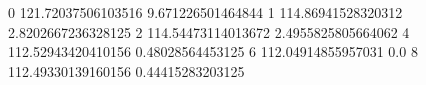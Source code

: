 0 121.72037506103516 9.671226501464844
1 114.86941528320312 2.8202667236328125
2 114.54473114013672 2.4955825805664062
4 112.52943420410156 0.48028564453125
6 112.04914855957031 0.0
8 112.49330139160156 0.44415283203125
